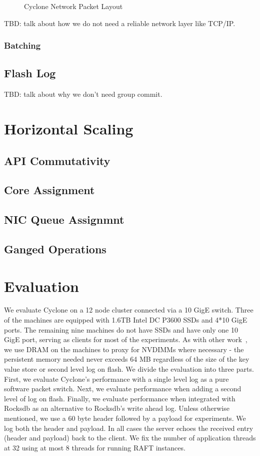 \documentclass[10pt, preprint, nonatbib]{sigplanconf}
\begin{document}
\begin{figure}
  \caption{Cyclone Network Packet Layout}
  \label{fig:packet_layout}
\end{figure}

TBD: talk about how we do not need a reliable network layer like TCP/IP.
\subsubsection{Batching}

\subsection{Flash Log}
TBD: talk about why we don't need group commit.
\section{Horizontal Scaling}

\subsection{API Commutativity}

\subsection{Core Assignment}

\subsection{NIC Queue Assignmnt}

\subsection{Ganged Operations}

\section{Evaluation}
We evaluate Cyclone on a 12 node cluster connected via a 10 GigE switch. Three
of the machines are equipped with 1.6TB Intel DC P3600 SSDs and 4*10 GigE
ports. The remaining nine machines do not have SSDs and have only one 10 GigE
port, serving as clients for most of the experiments. As with other
work~\cite{faast}, we use DRAM on the machines to proxy for NVDIMMs where
necessary - the persistent memory needed never exceeds 64 MB regardless of the
size of the key value store or second level log on flash. We divide the
evaluation into three parts. First, we evaluate Cyclone's performance with a
single level log as a pure software packet switch. Next, we evaluate performance
when adding a second level of log on flash. Finally, we evaluate performance
when integrated with Rocksdb as an alternative to Rocksdb's write ahead
log. Unless otherwise mentioned, we use a 60 byte header followed by a payload
for experiments. We log both the header and payload. In all cases the server
echoes the received entry (header and payload) back to the client. We fix the
number of application threads at 32 using at most 8 threads for running RAFT
instances.
\end{document}
